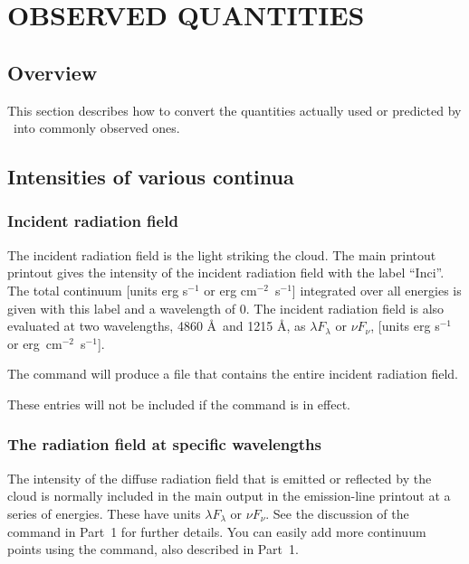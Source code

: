 \chapter{OBSERVED QUANTITIES}
\label{sec:ObservedQuantities}

\section{Overview}

This section describes how to convert the quantities actually used or
predicted by \Cloudy\ into commonly observed ones.

\section{Intensities of various continua}

\subsection{Incident radiation field}

The incident radiation field is the light striking the cloud.
The
main printout printout gives the intensity of the
incident radiation field with
the label ``Inci''.
The total continuum [units erg s$^{-1}$ or erg cm$^{-2}$~s$^{-1}$]
integrated over all energies is given with this label
and a wavelength of 0.
The incident
radiation field is also evaluated at two wavelengths,
4860 \AA\ and 1215 \AA ,
as $\lambda F_\lambda $ or $\nu F_\nu$,
[units erg s$^{-1}$ or erg~cm$^{-2}$~s$^{-1}$].

The  command will produce a file that
contains the entire incident radiation field.

These entries will not be included if the  command
is in effect.

\subsection{The radiation field at specific wavelengths}

The intensity of the diffuse radiation field that is
emitted or reflected by the cloud is normally included in the main output
in the emission-line printout at a series of energies.  These have units
$\lambda F_\lambda $ or $\nu F_\nu$. See the discussion of the
 command in Part~1 for further details.
You can easily add more continuum points using the
 command, also described in Part~1.

